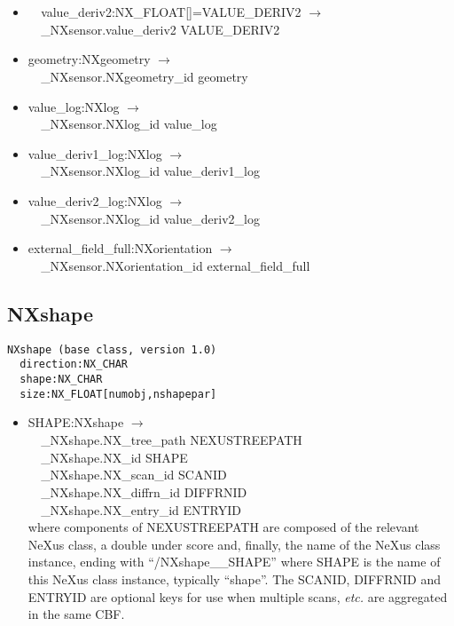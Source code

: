 \documentclass[11pt]{article}
\begin{document}
{{\begin{itemize}
\item{\verb|  |value\_deriv2:NX\_FLOAT[]=VALUE\_DERIV2 $\rightarrow$\\
\verb|  |\_NXsensor.value\_deriv2 VALUE\_DERIV2}

\item{geometry:NXgeometry $\rightarrow$\\
\verb|  |\_NXsensor.NXgeometry\_id geometry}

\item{value\_log:NXlog $\rightarrow$\\
\verb|  |\_NXsensor.NXlog\_id value\_log}

\item{value\_deriv1\_log:NXlog $\rightarrow$\\
\verb|  |\_NXsensor.NXlog\_id value\_deriv1\_log}

\item{value\_deriv2\_log:NXlog $\rightarrow$\\
\verb|  |\_NXsensor.NXlog\_id value\_deriv2\_log}

\item{external\_field\_full:NXorientation $\rightarrow$\\
\verb|  |\_NXsensor.NXorientation\_id external\_field\_full}
\end{itemize}
\subsection{NXshape}

\begin{verbatim}
NXshape (base class, version 1.0)
  direction:NX_CHAR
  shape:NX_CHAR
  size:NX_FLOAT[numobj,nshapepar]
\end{verbatim}

\begin{itemize}

\item{SHAPE:NXshape $\rightarrow$\\
\verb|  |\_NXshape.NX\_tree\_path    NEXUSTREEPATH \\
\verb|  |\_NXshape.NX\_id            SHAPE\\
\verb|  |\_NXshape.NX\_scan\_id      SCANID \\
\verb|  |\_NXshape.NX\_diffrn\_id    DIFFRNID \\
\verb|  |\_NXshape.NX\_entry\_id     ENTRYID \\
where components of NEXUSTREEPATH are composed of the
relevant NeXus class, a double under score and, finally, the
name of the NeXus class instance, ending with ``/NXshape\_\_SHAPE''
where SHAPE is the name of this NeXus class instance, typically ``shape''.
The SCANID, DIFFRNID and ENTRYID are optional keys for use
when multiple scans, {\it etc.} are aggregated in the same CBF.}


\end{itemize}}}
\end{document}
